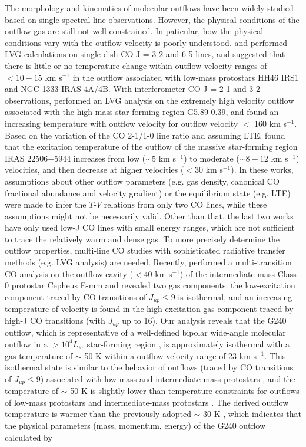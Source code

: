 The morphology and kinematics of molecular outflows have been widely studied based on single spectral line observations. However, the physical conditions of the outflow gas are still not well constrained. In paticular, how the physical conditions vary with the outflow velocity is poorly understood. \citet{2009A&A...501..633V} and \citet{2012A&A...542A..86Y} performed LVG calculations on single-dish CO J = 3-2 and 6-5 lines, and suggested that there is little or no temperature change within outflow velocity ranges of $<10-15$ km s$^{-1}$ in the outflow associated with low-mass protostars HH46 IRS1 and NGC 1333 IRAS 4A/4B. With interferometer CO J = 2-1 and 3-2 observations, \citet{2012ApJ...744L..26S} performed an LVG analysis on the extremely high velocity outflow associated with the high-mass star-forming region G5.89-0.39, and found an increasing temperature with outflow velocity for outflow velocity $<$ 160 km s$^{-1}$. Based on the variation of the CO 2-1/1-0 line ratio and assuming LTE, \citet{2018RAA....18...19X} found that the excitation temperature of the outflow of the massive star-forming region IRAS 22506+5944 increases from low ($\sim 5$ km s$^{-1}$) to moderate ($\sim8-12$ km s$^{-1}$) velocities, and then decrease at higher velocities ($<30$ km s$^{-1}$). In these works, assumptions about other outflow parameters (e.g. gas density, canonical CO fractional abundance and velocity gradient) or the equilibrium state (e.g. LTE) were made to infer the $T$-$V$ relations from only two CO lines, while these assumptions might not be necessarily valid. Other than that, the last two works have only used low-J CO lines with small energy ranges, which are not sufficient to trace the relatively warm and dense gas. To more precisely determine the outflow properties, multi-line CO studies with sophisticated radiative transfer methods (e.g. LVG analysis) are needed. Recently, \citet{2015A&A...581A...4L} performed a multi-transition CO analysis on the outflow cavity ($<40$ km s$^{-1}$) of the intermediate-mass Class 0 protostar Cepheus E-mm and revealed two gas components: the low-excitation component traced by CO transitions of $J_{up} \le 9$ is isothermal, and an increasing temperature of velocity is found in the high-excitation gas component traced by high-J CO transitions (with $J_{up}$ up to 16). Our analysis reveals that the G240 outflow, which is representative of a well-defined bipolar wide-angle molecular outflow in a $> 10^4 L_\sun$ star-forming region \citep{2009ApJ...696...66Q}, is approximately isothermal with a gas temperature of $\sim$ 50 K within a outflow velocity range of 23 km s$^{-1}$. This isothermal state is similar to the behavior of outflows (traced by CO transitions of $J_{up} \le 9$) associated with low-mass and intermediate-mass protostars \citep{2012A&A...542A..86Y, 2015A&A...581A...4L}, and the temperature of $\sim$ 50 K is slightly lower than temperature constraints for outflows of low-mass protostars \citep{2009A&A...501..633V, 2012A&A...542A..86Y} and intermediate-mass protostars \citep{2016A&A...587A..17V}. The derived outflow temperature is warmer than the previously adopted $\sim$ 30 K \citep{2009ApJ...696...66Q}, which indicates that the physical parameters (mass, momentum, energy) of the G240 outflow calculated by \citet{2009ApJ...696...66Q} 